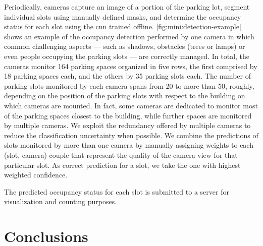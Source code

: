 Periodically, cameras capture an image of a portion of the parking lot, segment individual slots using manually defined masks, and determine the occupancy status for each slot using the \gls{cnn} trained offline.
\ref{fig:mini:detection-example} shows an example of the occupancy detection performed by one camera in which common challenging aspects --- such as shadows, obstacles (trees or lamps) or even people occupying the parking slots --- are correctly managed.
In total, the cameras monitor 164 parking spaces organized in five rows, the first comprised by 18 parking spaces each, and the others by 35 parking slots each.
The number of parking slots monitored by each camera spans from 20 to more than 50, roughly, depending on the position of the parking slots with respect to the building on which cameras are mounted.
In fact, some cameras are dedicated to monitor most of the parking spaces closest to the building, while further spaces are monitored by multiple cameras.
We exploit the redundancy offered by multiple cameras to reduce the classification uncertainty when possible.
We combine the predictions of slots monitored by more than one camera by manually assigning weights to each (slot, camera) couple that represent the quality of the camera view for that particular slot.
As correct prediction for a slot, we take the one with highest weighted confidence.

The predicted occupancy status for each slot is submitted to a server for visualization and counting purposes.


\section{Conclusions}
\label{sec:mini:conclusions}

